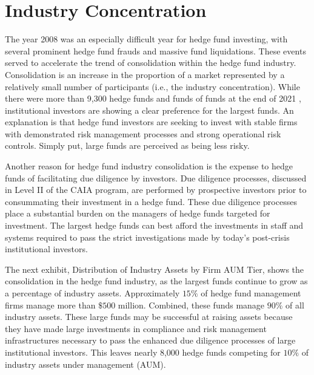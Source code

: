\documentclass[11pt]{article}
\begin{document}
\section*{Industry Concentration}
The year 2008 was an especially difficult year for hedge fund investing, with several prominent hedge fund frauds and massive fund liquidations. These events served to accelerate the trend of consolidation within the hedge fund industry. Consolidation is an increase in the proportion of a market represented by a relatively small number of participants (i.e., the industry concentration). While there were more than 9,300 hedge funds and funds of funds at the end of 2021 , institutional investors are showing a clear preference for the largest funds. An explanation is that hedge fund investors are seeking to invest with stable firms with demonstrated risk management processes and strong operational risk controls. Simply put, large funds are perceived as being less risky.

Another reason for hedge fund industry consolidation is the expense to hedge funds of facilitating due diligence by investors. Due diligence processes, discussed in Level II of the CAIA program, are performed by prospective investors prior to consummating their investment in a hedge fund. These due diligence processes place a substantial burden on the managers of hedge funds targeted for investment. The largest hedge funds can best afford the investments in staff and systems required to pass the strict investigations made by today's post-crisis institutional investors.

The next exhibit, Distribution of Industry Assets by Firm AUM Tier, shows the consolidation in the hedge fund industry, as the largest funds continue to grow as a percentage of industry assets. Approximately $15 \%$ of hedge fund management firms manage more than $\$ 500$ million. Combined, these funds manage $90 \%$ of all industry assets. These large funds may be successful at raising assets because they have made large investments in compliance and risk management infrastructures necessary to pass the enhanced due diligence processes of large institutional investors. This leaves nearly 8,000 hedge funds competing for $10 \%$ of industry assets under management (AUM).
\end{document}
